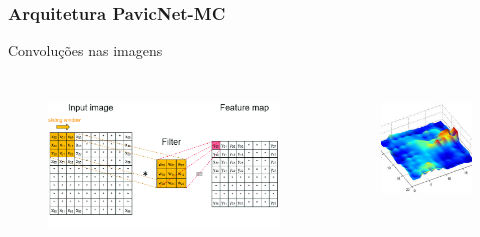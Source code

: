 \documentclass[aspectratio=169]{beamer}
\begin{document}



\begin{frame}
    \frametitle{Arquitetura PavicNet-MC}


    \centering
    Convoluções nas imagens

    \begin{columns}


        \begin{figure}
            \centering
            \includegraphics[scale = 0.8]{img/convolutionGrid.png}
            \label{fig:enter-label}
        \end{figure}




        \begin{figure}
            \centering
            \includegraphics[scale = 0.6]{img/Mapa de ativação.jpg}
            \label{fig:enter-label}
        \end{figure}



    \end{columns}

\end{frame}
\end{document}

